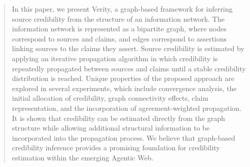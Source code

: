 \begin{abstract}

In this paper, we present Verity, a graph-based framework for inferring source credibility from the structure of an information network. The information network is represented as a bipartite graph, where nodes correspond to sources and claims, and edges correspond to assertions linking sources to the claims they assert. Source credibility is estimated by applying an iterative propagation algorithm in which credibility is repeatedly propagated between sources and claims until a stable credibility distribution is reached. Unique properties of the proposed approach are explored in several experiments, which include convergence analysis, the initial allocation of credibility, graph connectivity effects, claim representation, and the incorporation of agreement-weighted propagation. It is shown that credibility can be estimated directly from the graph structure while allowing additional structural information to be incorporated into the propagation process. We believe that graph-based credibility inference provides a promising foundation for credibility estimation within the emerging Agentic Web.

\end{abstract}